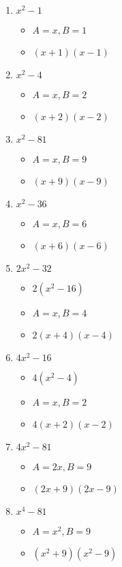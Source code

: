 \documentclass{article}
\begin{document}
\newpage
\begin{enumerate}
\item $x^{2} - 1$
  \begin{itemize}
  \item $A=x, B=1$
  \item $(x+1)(x-1)$
  \end{itemize}
\item $x^{2} - 4$
  \begin{itemize}
  \item $A=x, B=2$
  \item $(x+2)(x-2)$
  \end{itemize}
\item $x^{2} - 81$
  \begin{itemize}
  \item $A=x, B=9$
  \item $(x+9)(x-9)$
  \end{itemize}
\item $x^{2} - 36$
  \begin{itemize}
  \item $A=x, B=6$
  \item $(x+6)(x-6)$
  \end{itemize}
\item $2x^{2} - 32$
  \begin{itemize}
  \item $2(x^{2}-16)$
  \item $A=x, B=4$
  \item $2(x+4)(x-4)$
  \end{itemize}
\item $4x^{2} - 16$
  \begin{itemize}
  \item $4(x^{2}-4)$
  \item $A=x, B=2$
  \item $4(x+2)(x-2)$
  \end{itemize}
\item $4x^{2} - 81$
  \begin{itemize}
  \item $A=2x, B=9$
  \item $(2x+9)(2x-9)$
  \end{itemize}
\item $x^{4} - 81$
  \begin{itemize}
  \item $A=x^{2}, B=9$
  \item $(x^{2}+9)(x^{2}-9)$

\end{itemize}
\end{enumerate}
\end{document}
